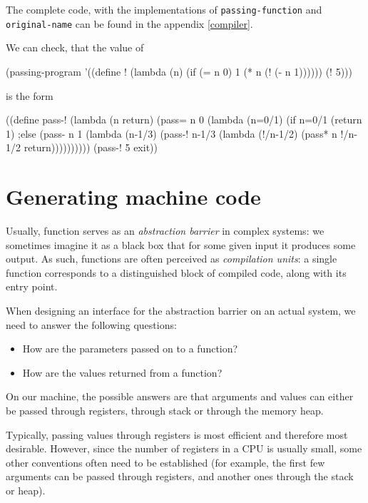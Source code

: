 The complete code, with the implementations of \texttt{passing-function}
and \texttt{original-name} can be found in the appendix \ref{compiler}.

We can check, that the value of

\begin{Snippet}
(passing-program '((define !
                     (lambda (n)
	               (if (= n 0)
                           1
			   (* n (! (- n 1))))))
		    (! 5)))
\end{Snippet}

is the form

\begin{Snippet}
((define pass-!
   (lambda (n return)
     (pass= n 0
       (lambda (n=0/1)
         (if n=0/1
            (return 1)
         ;else
            (pass- n 1
	      (lambda (n-1/3)
                (pass-! n-1/3
		  (lambda (!/n-1/2)
	            (pass* n !/n-1/2 return))))))))))
 (pass-! 5 exit))
\end{Snippet}

\section{Generating machine code}

Usually, function serves as an \textit{abstraction barrier} in
complex systems: we sometimes imagine it as a black box that
for some given input it produces some output. As such, functions
are often perceived as \textit{compilation units}: a single function
corresponds to a distinguished block of compiled code, along with its
entry point.

When designing an interface for the abstraction barrier on an actual
system, we need to answer the following questions:
\begin{itemize}
\item How are the parameters passed on to a function?
\item How are the values returned from a function?
\end{itemize}

On our machine, the possible answers are that arguments and
values can either be passed through registers, through stack
or through the memory heap.

Typically, passing values through registers is most efficient
and therefore most desirable. However, since the number of
registers in a CPU is usually small, some other conventions
often need to be established (for example, the first few
arguments can be passed through registers, and another ones
through the stack or heap).

